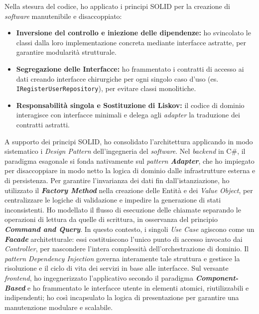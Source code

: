 Nella stesura del codice, ho applicato i principi SOLID per la creazione di \textit{software} manutenibile e disaccoppiato:
\begin{itemize}
    \item \textbf{Inversione del controllo e iniezione delle dipendenze:} ho svincolato le classi dalla loro implementazione concreta mediante interfacce astratte, per garantire modularità strutturale.
    \item \textbf{Segregazione delle Interfacce:} ho frammentato i contratti di accesso ai dati creando interfacce chirurgiche per ogni singolo caso d'uso (es. \texttt{IRegisterUserRepository}), per evitare classi monolitiche.
    \item \textbf{Responsabilità singola e Sostituzione di Liskov:} il codice di dominio interagisce con interfacce minimali e delega agli \textit{adapter} la traduzione dei contratti astratti.
\end{itemize}

A supporto dei principi SOLID, ho consolidato l'architettura applicando in modo sistematico i \textit{Design Pattern} dell'ingegneria del \textit{software}. Nel \textit{backend} in C\#, il paradigma esagonale si fonda nativamente sul \textit{pattern \textbf{Adapter}}, che ho impiegato per disaccoppiare in modo netto la logica di dominio dalle infrastrutture esterna e di persistenza. Per garantire l'invarianza dei dati fin dall'istanziazione, ho utilizzato il \textbf{\textit{Factory Method}} nella creazione delle Entità e dei \textit{Value Object},  per centralizzare le logiche di validazione e impedire la generazione di stati inconsistenti. Ho modellato il flusso di esecuzione delle chiamate separando le operazioni di lettura da quelle di scrittura, in osservanza del principio \textbf{\textit{Command and Query}}. In questo contesto, i singoli \textit{Use Case} agiscono come un \textbf{\textit{Facade}} architetturale: essi costituiscono l'unico punto di accesso invocato dai \textit{Controller}, per nascondere l'intera complessità dell'orchestrazione di dominio. Il \textit{pattern Dependency Injection} governa interamente tale struttura e gestisce la risoluzione e il ciclo di vita dei servizi in base alle interfacce. Sul versante \textit{frontend}, ho ingegnerizzato l'applicativo secondo il paradigma \textbf{\textit{Component-Based}} e ho frammentato le interfacce utente in elementi atomici, riutilizzabili e indipendenti; ho così incapsulato la logica di presentazione per garantire una manutenzione modulare e scalabile.


